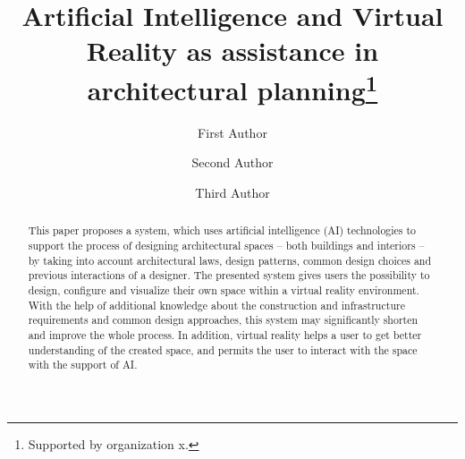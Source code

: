 \documentclass[runningheads]{llncs}
\begin{document}
%
\title{Artificial Intelligence and Virtual Reality as assistance in architectural planning\thanks{Supported by organization x.}}
%
%
\author{First Author \and
Second Author \and
Third Author}
%
%
%
\maketitle              %
%
\begin{abstract}
This paper proposes a system, which uses artificial intelligence (AI) technologies to support the process of designing architectural spaces – both buildings and interiors – by taking into account architectural laws, design patterns, common design choices and previous interactions of a designer. The presented system gives users the possibility to design, configure and visualize their own space within a virtual reality environment. With the help of additional knowledge about the construction and infrastructure requirements and common design approaches, this system may significantly shorten and improve the whole process. In addition, virtual reality helps a user to get better understanding of the created space, and permits the user to interact with the space with the support of AI.

\end{abstract}
%
%
%
\end{document}
